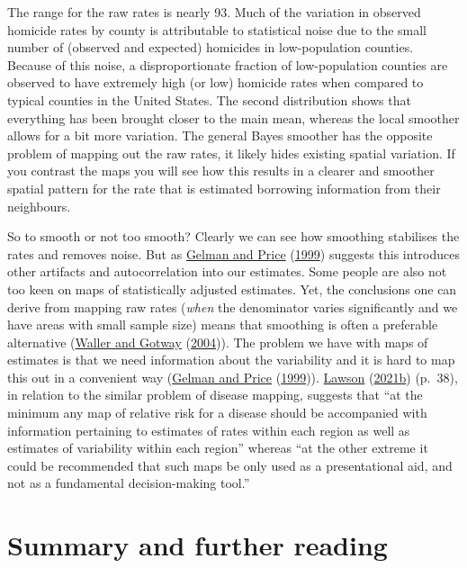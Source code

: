 \documentclass[
  krantz2]{krantz}
\begin{document}
The range for the raw rates is nearly 93. Much of the variation in observed homicide rates by county is attributable to statistical noise due to the small number of (observed and expected) homicides in low-population counties. Because of this noise, a disproportionate fraction of low-population counties are observed to have extremely high (or low) homicide rates when compared to typical counties in the United States. The second distribution shows that everything has been brought closer to the main mean, whereas the local smoother allows for a bit more variation. The general Bayes smoother has the opposite problem of mapping out the raw rates, it likely hides existing spatial variation. If you contrast the maps you will see how this results in a clearer and smoother spatial pattern for the rate that is estimated borrowing information from their neighbours.

So to smooth or not too smooth? Clearly we can see how smoothing stabilises the rates and removes noise. But as \protect\hyperlink{ref-Gelman_1999}{Gelman and Price} (\protect\hyperlink{ref-Gelman_1999}{1999}) suggests this introduces other artifacts and autocorrelation into our estimates. Some people are also not too keen on maps of statistically adjusted estimates. Yet, the conclusions one can derive from mapping raw rates (\emph{when} the denominator varies significantly and we have areas with small sample size) means that smoothing is often a preferable alternative (\protect\hyperlink{ref-Waller_2004}{Waller and Gotway} (\protect\hyperlink{ref-Waller_2004}{2004})). The problem we have with maps of estimates is that we need information about the variability and it is hard to map this out in a convenient way (\protect\hyperlink{ref-Gelman_1999}{Gelman and Price} (\protect\hyperlink{ref-Gelman_1999}{1999})). \protect\hyperlink{ref-Lawson_2006}{Lawson} (\protect\hyperlink{ref-Lawson_2006}{2021b}) (p.~38), in relation to the similar problem of disease mapping, suggests that ``at the minimum any map of relative risk for a disease should be accompanied with information pertaining to estimates of rates within each region as well as estimates of variability within each region'' whereas ``at the other extreme it could be recommended that such maps be only used as a presentational aid, and not as a fundamental decision-making tool.''

\hypertarget{summary-and-further-reading-2}{%
\section{Summary and further reading}\label{summary-and-further-reading-2}}
\end{document}
